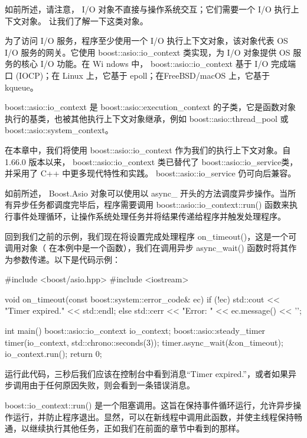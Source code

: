 如前所述，请注意， I/O 对象不直接与操作系统交互；它们需要一个 I/O 执行上下文对象。
让我们了解一下这类对象。


为了访问 I/O 服务，程序至少使用一个 I/O 执行上下文对象，该对象代表 OS I/O 服务的网关。它使用 boost::asio::io\_context 类实现，为 I/O 对象提供 OS 服务的核心 I/O 功能。在 Wi ndows 中， boost::asio::io\_context 基于 I/O 完成端口 (IOCP)；在 Linux 上，它基于 epoll；在FreeBSD/macOS 上，它基于 kqueue。


boost::asio::io\_context 是 boost::asio::execution\_context 的子类，它是函数对象执行的基类，也被其他执行上下文对象继承，例如 boost::asio::thread\_pool 或 boost::asio::system\_context。

在本章中，我们将使用 boost::asio::io\_context 作为我们的执行上下文对象。自 1.66.0 版本以来， boost::asio::io\_context 类已替代了 boost::asio::io\_service类，并采用了 C++ 中更多现代特性和实践。 boost::asio::io\_service 仍可向后兼容。

如前所述， Boost.Asio 对象可以使用以 async\_ 开头的方法调度异步操作。当所有异步任务都调度完毕后，程序需要调用 boost::asio::io\_context::run() 函数来执行事件处理循环，让操作系统处理任务并将结果传递给程序并触发处理程序。

回到我们之前的示例，我们现在将设置完成处理程序 on\_timeout()，这是一个可调用对象（ 在本例中是一个函数），我们在调用异步 async\_wait() 函数时将其作为参数传递。以下是代码示例：

\begin{cpp}
#include <boost/asio.hpp>
#include <iostream>

void on_timeout(const boost::system::error_code& ec) {
    if (!ec) {
        std::cout << "Timer expired.\n" << std::endl;
    } else {
        std::cerr << "Error: " << ec.message() << '\n';
    }
}

int main() {
    boost::asio::io_context io_context;
    boost::asio::steady_timer timer(io_context,
                                std::chrono::seconds(3));
    timer.async_wait(&on_timeout);
    io_context.run();
    return 0;
}
\end{cpp}

运行此代码，三秒后我们应该在控制台中看到消息“Timer expired.”，或者如果异步调用由于任何原因失败，则会看到一条错误消息。

boost::io\_context::run() 是一个阻塞调用。这旨在保持事件循环运行，允许异步操作运行，并防止程序退出。显然，可以在新线程中调用此函数，并使主线程保持畅通，以继续执行其他任务，正如我们在前面的章节中看到的那样。

